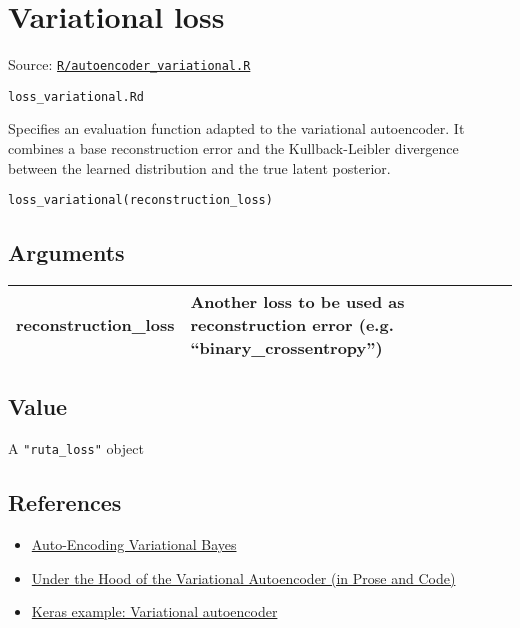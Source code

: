 \section{Variational loss}\label{variational-loss}

Source:
\href{https://github.com/fdavidcl/ruta/blob/master/R/autoencoder_variational.R}{\texttt{R/autoencoder\_variational.R}}

\texttt{loss\_variational.Rd}

Specifies an evaluation function adapted to the variational autoencoder.
It combines a base reconstruction error and the Kullback-Leibler
divergence between the learned distribution and the true latent
posterior.

\begin{verbatim}
loss_variational(reconstruction_loss)
\end{verbatim}

\hypertarget{arguments}{\subsection{\texorpdfstring{\protect\hyperlink{arguments}{}Arguments}{Arguments}}\label{arguments}}

\begin{longtable}[c]{@{}ll@{}}
\toprule
reconstruction\_loss & Another loss to be used as reconstruction error
(e.g. ``binary\_crossentropy'')\tabularnewline
\bottomrule
\end{longtable}

\hypertarget{value}{\subsection{\texorpdfstring{\protect\hyperlink{value}{}Value}{Value}}\label{value}}

A \texttt{"ruta\_loss"} object

\hypertarget{references}{\subsection{\texorpdfstring{\protect\hyperlink{references}{}References}{References}}\label{references}}

\begin{itemize}
\item
  \href{https://arxiv.org/abs/1312.6114}{Auto-Encoding Variational
  Bayes}
\item
  \href{http://blog.fastforwardlabs.com/2016/08/22/under-the-hood-of-the-variational-autoencoder-in.html}{Under
  the Hood of the Variational Autoencoder (in Prose and Code)}
\item
  \href{https://keras.rstudio.com/articles/examples/variational_autoencoder.html}{Keras
  example: Variational autoencoder}
\end{itemize}

